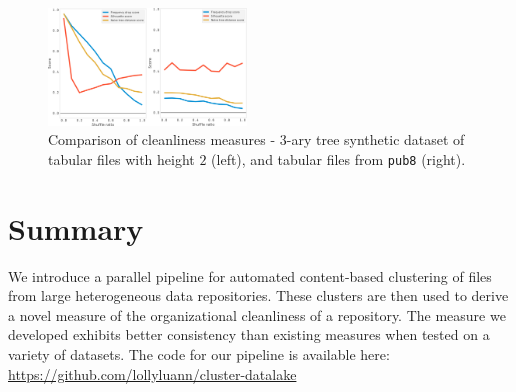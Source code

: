 \documentclass[sigconf,screen]{acmart}
\begin{document}
\begin{center}
\begin{figure}[!htbp]
\includegraphics[width=0.47\textwidth]{side-by-side_eval.png}
\setlength{\belowcaptionskip}{-20pt}
\caption{\label{cleanlinessgraphs} Comparison of cleanliness measures - \textmd{$3$-ary tree synthetic dataset of tabular files with height $2$ (left), and tabular files from \texttt{pub8} (right). }}
\end{figure}
\end{center}

\section{Summary}
We introduce a parallel pipeline for automated content-based clustering of files from large heterogeneous data repositories. These clusters are then used to derive a novel measure of the organizational cleanliness of a repository. The measure we developed exhibits better consistency than existing measures when tested on a variety of datasets. The code for our pipeline is available here: 
\url{https://github.com/lollyluann/cluster-datalake}

\nocite{*}  %


\end{document}
